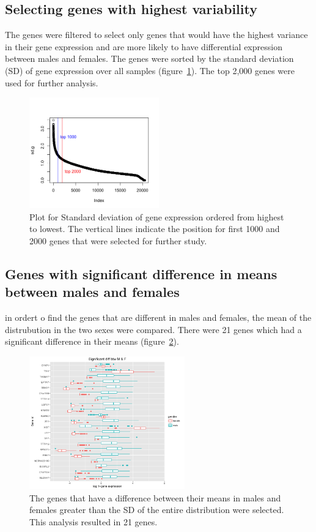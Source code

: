 \documentclass[11pt]{article} %
\begin{document}
\subsection{Selecting genes with highest variability}

The genes were filtered to select only genes that would have the highest variance in their gene expression and are more likely to have differential expression between males and females. The genes were sorted by the standard deviation (SD) of gene expression over all samples (figure~\ref{sd-plot}). The top 2,000 genes were used for further analysis.

\begin{figure}[htbp]
\centering
\includegraphics[width=0.5\textwidth]{Plots/SD-plot_top1k2k.png}
\caption{Plot for Standard deviation of gene expression ordered from highest to lowest. The vertical lines indicate the position for first 1000 and 2000 genes that were selected for further study.}
\label{sd-plot}
\end{figure}

\subsection{Genes with significant difference in means between males and females}

in ordert o find the genes that are different in males and females, the mean of the distrubution in the two sexes were compared. There were 21 genes which had a significant difference in their means  (figure~\ref{diff-mean}).

\begin{figure}[htb]
\centering
\includegraphics[width=0.6\textwidth]{Plots/Signif21_genenames_boxplot.png}
\caption{The genes that have a difference between their means in males and females greater than the SD of the entire distribution were selected. This analysis resulted in 21 genes.}
\label{diff-mean}
\end{figure}
\end{document}
